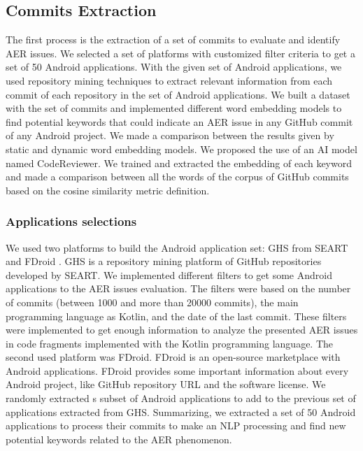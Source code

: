 \subsection{Commits Extraction}
The first process is the extraction of a set of commits to evaluate and identify AER issues. We selected a set of platforms with customized filter criteria to get a set of 50 Android applications. With the given set of Android applications, we used repository mining techniques to extract relevant information from each commit of each repository in the set of Android applications. We built a dataset with the set of commits and implemented different word embedding models to find potential keywords that could indicate an AER issue in any GitHub commit of any Android project. We made a comparison between the results given by static and dynamic word embedding models. We proposed the use of an AI model named CodeReviewer. We trained and extracted the embedding of each keyword and made a comparison between all the words of the corpus of GitHub commits based on the cosine similarity metric definition.

\subsubsection{Applications selections}
We used two platforms to build the Android application set: GHS from SEART and FDroid \cite{seart,fdroid}. GHS is a repository mining platform of GitHub repositories developed by SEART. We implemented different filters to get some Android applications to the AER issues evaluation. The filters were based on the number of commits (between 1000 and more than 20000 commits), the main programming language as Kotlin, and the date of the last commit. These filters were implemented to get enough information to analyze the presented AER issues in code fragments implemented with the Kotlin programming language.
The second used platform was FDroid. FDroid is an open-source marketplace with Android applications. FDroid provides some important information about every Android project, like GitHub repository URL and the software license. We randomly extracted s subset of Android applications to add to the previous set of applications extracted from GHS. Summarizing, we extracted a set of 50 Android applications to process their commits to make an NLP processing and find new potential keywords related to the AER phenomenon.

